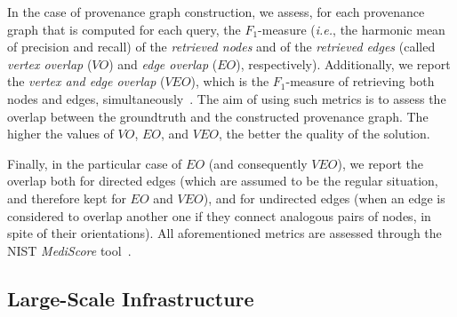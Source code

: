 In the case of provenance graph construction, we assess, for each provenance graph that is computed for each query, the $F_1$-measure (\textit{i.e.}, the harmonic mean of precision and recall) of the \emph{retrieved nodes} and of the \emph{retrieved edges} (called \emph{vertex overlap} ($VO$) and \emph{edge overlap} ($EO$), respectively).
Additionally, we report the \emph{vertex and edge overlap} ($VEO$), which is the $F_1$-measure of retrieving both nodes and edges, simultaneously~\cite{Papadimitriou_2010}.
The aim of using such metrics is to assess the overlap between the groundtruth and the constructed provenance graph.
The higher the values of $VO$, $EO$, and $VEO$, the better the quality of the solution.

Finally, in the particular case of $EO$ (and consequently $VEO$), we report the overlap both for directed edges (which are assumed to be the regular situation, and therefore kept for $EO$ and $VEO$), and for undirected edges (when an edge is considered to overlap another one if they connect analogous pairs of nodes, in spite of their orientations).
All aforementioned metrics are assessed through the NIST \emph{MediScore} tool~\cite{nist2017plan}.


\subsection{Large-Scale Infrastructure}
\label{sec:exp_lsi}

